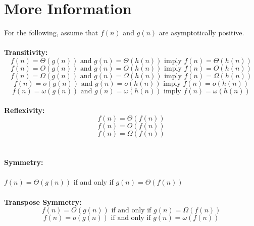 \documentclass{article}
\begin{document}
\newpage
\section*{More Information}
For the following, assume that $f(n)$ and $g(n)$ are asymptotically positive.
\\ \\
\textbf{Transitivity:}\\
\begin{equation*}
f(n) = \Theta{(g(n))} \text{ and } g(n) = \Theta{(h(n))} \text{ imply } f(n) = \Theta{(h(n))}
\end{equation*}
\begin{equation*}
f(n) = O{(g(n))} \text{ and } g(n) = O{(h(n))} \text{ imply } f(n) = O{(h(n))}
\end{equation*}
\begin{equation*}
f(n) = \Omega{(g(n))} \text{ and } g(n) = \Omega{(h(n))} \text{ imply } f(n) = \Omega{(h(n))}
\end{equation*}
\begin{equation*}
f(n) = o{(g(n))} \text{ and } g(n) = o{(h(n))} \text{ imply } f(n) = o{(h(n))}
\end{equation*}
\begin{equation*}
f(n) = \omega{(g(n))} \text{ and } g(n) = \omega{(h(n))} \text{ imply } f(n) = \omega{(h(n))}
\end{equation*}
\\
\textbf{Reflexivity:}\\
\begin{equation*}
f(n) = \Theta{(f(n))}
\end{equation*}
\begin{equation*}
f(n) = O{(f(n))}
\end{equation*}
\begin{equation*}
f(n) = \Omega{(f(n))}
\end{equation*}
\\ \\
\textbf{Symmetry:}
\\ \\
$f(n) = \Theta{(g(n))}$ if and only if $g(n) = \Theta{(f(n))}$
\\ \\
\textbf{Transpose Symmetry:}\\
\begin{equation*}
f(n) = O{(g(n))} \text{ if and only if } g(n) = \Omega{(f(n))}
\end{equation*}
\begin{equation*}
f(n) = o{(g(n))} \text{ if and only if } g(n) = \omega{(f(n))}
\end{equation*}
\end{document}
